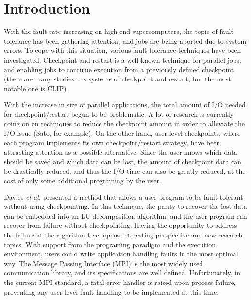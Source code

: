 \documentclass[Afour,times,sagev]{sagej}
\begin{document}

\maketitle

\section{Introduction}

With the fault rate increasing on high-end supercomputers, the topic
of fault tolerance has been gathering attention\citep{techrep10040},
and jobs are being aborted due to system errors\citep{6903615}. To cope
with this situation, various fault tolerance techniques have been
investigated. Checkpoint and restart is a well-known technique for
parallel jobs, and enabling jobs to continue execution from a
previously defined checkpoint (there are many studies ans systems of
checkpoint and restart, but the most notable one is CLIP\citep{CLIP}).

With the increase in size of parallel applications, the total amount
of I/O needed for checkpoint/restart begun to be problematic. A lot of 
research is currently going on on techniques to reduce the checkpoint
amount in order to alleviate the I/O issue
(Sato\citep{Sato:2012:DMN:2388996.2389022}, for example). On the other
hand, user-level
checkpoints, where each program implements its own checkpoint/restart
strategy, have been attracting attention as a possible
alternative. Since the user knows which data should be saved and which
data can be lost, the amount of checkpoint data can be drastically
reduced, and thus the I/O time can also be greatly reduced, at the
cost of only some additional programing by the user.

Davies {\it et al.} presented a method that allows a user program to
be fault-tolerant without using
checkpointing\citep{Chen:2008:AFT:1477064.1477361}. In this
technique, the parity to recover the lost data can be embedded into an
LU decomposition algorithm, and the user program can recover from
failure without checkpointing. Having the opportunity to address the
failure at the algorithm level opens interesting perspective and new
research topics. With support from the programing paradigm and the
execution environment, users could write application handling faults
in the most optimal way. The Message Passing Interface (MPI) is the
most widely used communication library, and its specifications are
well defined\citep{mpi-v3}. Unfortunately, in the current MPI standard,
a fatal error handler is raised upon process failure, preventing any
user-level fault handling to be implemented at this time.
\end{document}
